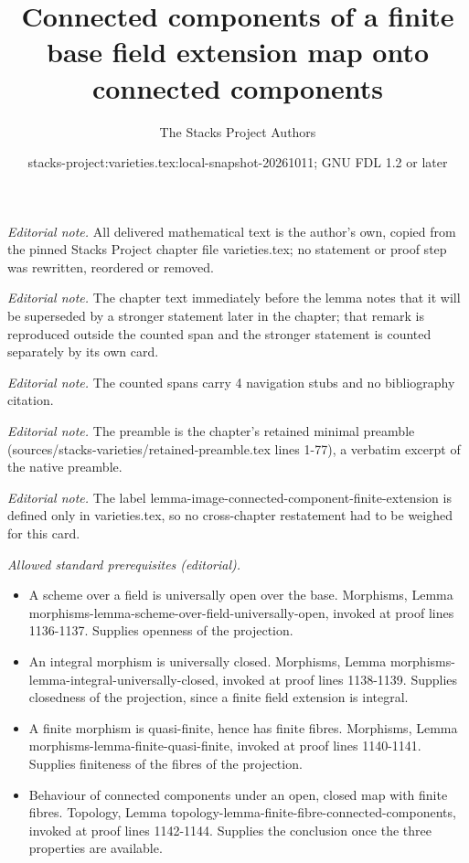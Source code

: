 \documentclass[10pt,a4paper]{amsart}
\title{Connected components of a finite base field extension map onto connected components}
\author{The Stacks Project Authors}
\date{stacks-project:varieties.tex:local-snapshot-20261011; GNU FDL 1.2 or later}
\theoremstyle{plain}
\theoremstyle{definition}
\theoremstyle{remark}
\numberwithin{equation}{subsection}
\begin{document}
\maketitle
\noindent\textit{Editorial note.} All delivered mathematical text is the author's own, copied from the pinned Stacks Project chapter file varieties.tex; no statement or proof step was rewritten, reordered or removed.\par\medskip
\noindent\textit{Editorial note.} The chapter text immediately before the lemma notes that it will be superseded by a stronger statement later in the chapter; that remark is reproduced outside the counted span and the stronger statement is counted separately by its own card.\par\medskip
\noindent\textit{Editorial note.} The counted spans carry 4 navigation stubs and no bibliography citation.\par\medskip
\noindent\textit{Editorial note.} The preamble is the chapter's retained minimal preamble (sources/stacks-varieties/retained-preamble.tex lines 1-77), a verbatim excerpt of the native preamble.\par\medskip
\noindent\textit{Editorial note.} The label lemma-image-connected-component-finite-extension is defined only in varieties.tex, so no cross-chapter restatement had to be weighed for this card.\par\medskip
\noindent\textit{Allowed standard prerequisites (editorial).}\begin{itemize}
\item A scheme over a field is universally open over the base. Morphisms, Lemma morphisms-lemma-scheme-over-field-universally-open, invoked at proof lines 1136-1137. Supplies openness of the projection.
\item An integral morphism is universally closed. Morphisms, Lemma morphisms-lemma-integral-universally-closed, invoked at proof lines 1138-1139. Supplies closedness of the projection, since a finite field extension is integral.
\item A finite morphism is quasi-finite, hence has finite fibres. Morphisms, Lemma morphisms-lemma-finite-quasi-finite, invoked at proof lines 1140-1141. Supplies finiteness of the fibres of the projection.
\item Behaviour of connected components under an open, closed map with finite fibres. Topology, Lemma topology-lemma-finite-fibre-connected-components, invoked at proof lines 1142-1144. Supplies the conclusion once the three properties are available.
\end{itemize}\medskip
\end{document}
